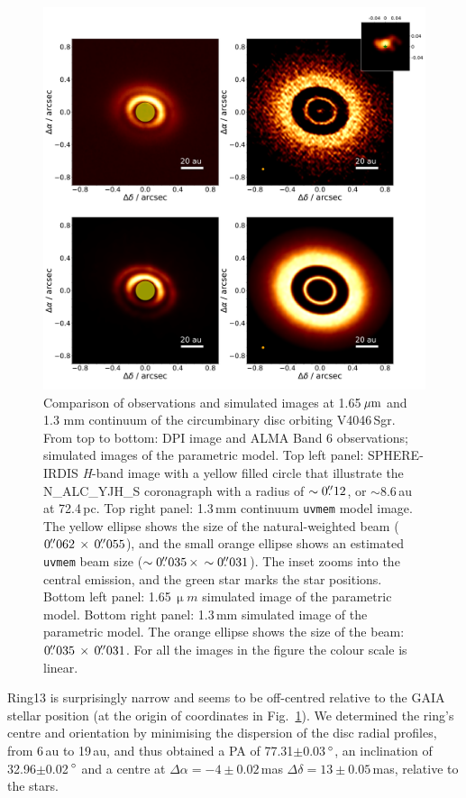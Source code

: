 \documentclass[letters,usenatbib,times]{mnras}
\begin{document}
\begin{figure}
  \includegraphics[width=\textwidth]{hot_two_E.pdf}
  \caption{Comparison of observations and simulated images at 1.65\,$\hbox{$\mu$m}$ and 1.3 mm continuum of the circumbinary disc orbiting V4046\,Sgr. From top to bottom: DPI image and ALMA Band 6 observations; simulated images of the parametric model. Top left panel: SPHERE-IRDIS \textit{H}-band image with a yellow filled circle that illustrate the N\_ALC\_YJH\_S coronagraph with a radius of $\sim0\hbox{$.\!\!^{\prime\prime}$}12$, or $\sim$8.6\,au at 72.4\,pc. Top right panel: 1.3\,mm continuum {\tt uvmem} model image. The yellow ellipse shows the size of the natural-weighted beam ($ 0\hbox{$.\!\!^{\prime\prime}$}062 \, \times \, 0\hbox{$.\!\!^{\prime\prime}$}055$), and the small orange ellipse shows an estimated {\tt uvmem} beam size ($\sim0\hbox{$.\!\!^{\prime\prime}$}035 \, \times \, \sim0\hbox{$.\!\!^{\prime\prime}$}031$). The inset zooms into the central emission, and the green star marks the star positions. Bottom left panel: 1.65\,$\upmu m$ simulated image of the parametric model. Bottom right panel: 1.3\,mm simulated image of the parametric model. The orange ellipse shows the size of the beam: $0\hbox{$.\!\!^{\prime\prime}$}035 \, \times \, 0\hbox{$.\!\!^{\prime\prime}$}031$. For all the images in the figure the colour scale is linear.}
  \label{fig:images_vs_simulated}
\end{figure}

Ring13 is surprisingly narrow and seems to be off-centred relative to the GAIA stellar position (at the origin of coordinates in Fig.~\ref{fig:images_vs_simulated}). We determined the ring's centre and orientation by minimising the dispersion of the disc radial profiles, from 6\,au to 19\,au, and thus obtained a PA of 77.31$\pm$0.03\,$\hbox{$^\circ$}$, an inclination of 32.96$\pm$0.02\,$\hbox{$^\circ$}$ and a centre at $\Delta \alpha = -4\pm0.02$\,mas $\Delta \delta = 13\pm0.05$\,mas, relative to the stars.
\end{document}

